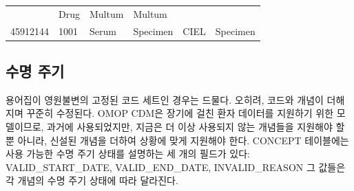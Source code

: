 \documentclass[11pt]{book}
\theoremstyle{definition}
\theoremstyle{definition}
\theoremstyle{definition}
\theoremstyle{remark}
\begin{document}
\begin{longtable}[]{@{}llllll@{}}
\begin{minipage}[t]{0.16\columnwidth}
\end{minipage} & \begin{minipage}[t]{0.14\columnwidth}\raggedright\strut
Drug\strut
\end{minipage} & \begin{minipage}[t]{0.14\columnwidth}\raggedright\strut
Multum\strut
\end{minipage} & \begin{minipage}[t]{0.14\columnwidth}\raggedright\strut
Multum\strut
\end{minipage}\tabularnewline
\begin{minipage}[t]{0.13\columnwidth}\raggedright\strut
45912144\strut
\end{minipage} & \begin{minipage}[t]{0.07\columnwidth}\raggedright\strut
1001\strut
\end{minipage} & \begin{minipage}[t]{0.16\columnwidth}\raggedright\strut
Serum\strut
\end{minipage} & \begin{minipage}[t]{0.14\columnwidth}\raggedright\strut
Specimen\strut
\end{minipage} & \begin{minipage}[t]{0.14\columnwidth}\raggedright\strut
CIEL\strut
\end{minipage} & \begin{minipage}[t]{0.14\columnwidth}\raggedright\strut
Specimen\strut
\end{minipage}\tabularnewline
\bottomrule
\end{longtable}

\subsection{수명 주기}\label{conceptLifeCycle}

용어집이 영원불변의 고정된 코드 세트인 경우는 드물다. 오히려, 코드와
개념이 더해지며 꾸준히 수정된다. OMOP CDM은 장기에 걸친 환자 데이터를
지원하기 위한 모델이므로, 과거에 사용되었지만, 지금은 더 이상 사용되지
않는 개념들을 지원해야 할 뿐 아니라, 신설된 개념을 더하여 상황에 맞게
지원해야 한다. CONCEPT 테이블에는 사용 가능한 수명 주기 상태를 설명하는
세 개의 필드가 있다: VALID\_START\_DATE, VALID\_END\_DATE,
INVALID\_REASON 그 값들은 각 개념의 수명 주기 상태에 따라 달라진다.
\end{document}
